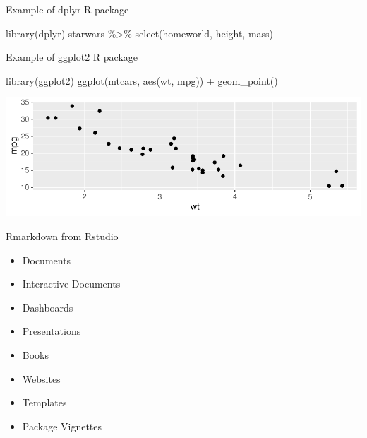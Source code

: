 \documentclass[
  ignorenonframetext,
]{beamer}
\newenvironment{Shaded}{\begin{snugshade}}{\end{snugshade}}
\newcommand{\FunctionTok}[1]{\textcolor[rgb]{0.94,0.94,0.56}{#1}}
\newcommand{\NormalTok}[1]{\textcolor[rgb]{0.80,0.80,0.80}{#1}}
\newcommand{\SpecialCharTok}[1]{\textcolor[rgb]{0.86,0.64,0.64}{#1}}
\providecommand{\tightlist}{%
  \setlength{\itemsep}{0pt}\setlength{\parskip}{0pt}}
\begin{document}
\begin{frame}[fragile]{Example of dplyr R package}
\protect\hypertarget{example-of-dplyr-r-package}{}
\begin{Shaded}
\begin{Highlighting}[]
\FunctionTok{library}\NormalTok{(dplyr)}
\NormalTok{starwars }\SpecialCharTok{\%\textgreater{}\%} 
  \FunctionTok{select}\NormalTok{(homeworld, height, mass) }
\end{Highlighting}
\end{Shaded}
\end{frame}

\begin{frame}[fragile]{Example of ggplot2 R package}
\protect\hypertarget{example-of-ggplot2-r-package}{}
\begin{Shaded}
\begin{Highlighting}[]
\FunctionTok{library}\NormalTok{(ggplot2)}
\FunctionTok{ggplot}\NormalTok{(mtcars, }\FunctionTok{aes}\NormalTok{(wt, mpg)) }\SpecialCharTok{+} 
  \FunctionTok{geom\_point}\NormalTok{()}
\end{Highlighting}
\end{Shaded}

\includegraphics{slides_UFSCar_files/figure-beamer/unnamed-chunk-5-1.pdf}
\end{frame}

\begin{frame}{Rmarkdown from Rstudio}
\protect\hypertarget{rmarkdown-from-rstudio}{}
\begin{itemize}[<+->]
\tightlist
\item
  Documents
\item
  Interactive Documents
\item
  Dashboards
\item
  Presentations
\item
  Books
\item
  Websites
\item
  Templates
\item
  Package Vignettes
\end{itemize}
\end{frame}
\end{document}
